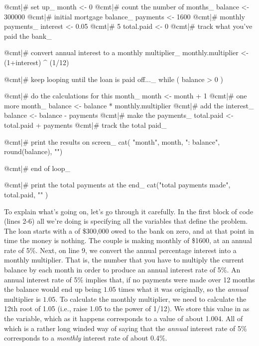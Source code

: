 \begin{script}
@cmt|# set up_
month <- 0  @cmt|# count the number of months_
balance <- 300000 @cmt|# initial mortgage balance_
payments <- 1600 @cmt|# monthly payments_
interest <- 0.05  @cmt|# 5%
total.paid <- 0 @cmt|# track what you've paid the bank_

@cmt|# convert annual interest to a monthly multiplier_
monthly.multiplier <- (1+interest) ^ (1/12)

@cmt|# keep looping until the loan is paid off..._
while ( balance > 0 ) {
  
  @cmt|# do the calculations for this month_
  month <- month + 1  @cmt|# one more month_
  balance <- balance * monthly.multiplier  @cmt|# add the interest_
  balance <- balance - payments  @cmt|# make the payments_
  total.paid <- total.paid + payments @cmt|# track the total paid_
  
  @cmt|# print the results on screen_
  cat( "month", month, ": balance", round(balance), "\n")
  
} @cmt|# end of loop_

@cmt|# print the total payments at the end_
cat("total payments made", total.paid, "\n" )
\end{script}
To explain what's going on, let's go through it carefully. In the first block of code (lines 2-6) all we're doing is specifying all the variables that define the problem. The loan starts with a  of \$300,000 owed to the bank on  zero, and at that point in time the  money is nothing. The couple is making monthly  of \$1600, at an annual  rate of 5\%. Next, on line 9, we convert the annual percentage interest into a monthly multiplier. That is, the number that you have to multiply the current balance by each month in order to produce an annual interest rate of 5\%. An annual interest rate of 5\% implies that, if no payments were made over 12 months the balance would end up being $1.05$ times what it was originally, so the {\it annual} multiplier is $1.05$. To calculate the monthly multiplier, we need to calculate the 12th root of 1.05 (i.e., raise 1.05 to the power of 1/12). We store this value in as the  variable, which as it happens corresponds to a value of about 1.004. All of which is a rather long winded way of saying that the {\it annual} interest rate of 5\% corresponds to a {\it monthly} interest rate of about 0.4\%. 

